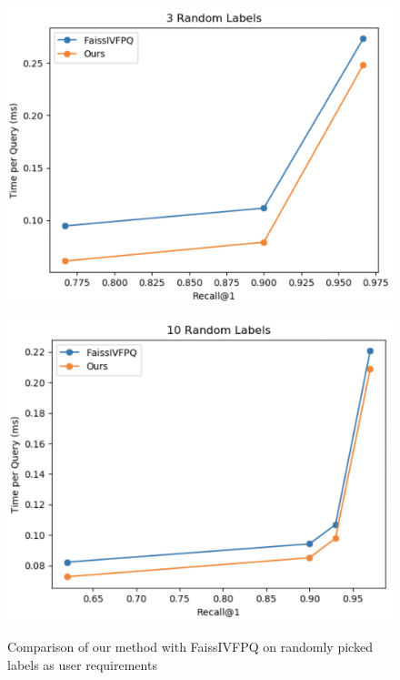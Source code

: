 \begin{figure}
    \centering
    \begin{minipage}[b]{.5\textwidth}
        \centering
        \includegraphics[width=.9\linewidth]{thesis/images/3_random.png}
        \label{fig:randomexpsub1}
    \end{minipage}%
    \begin{minipage}[b]{.5\textwidth}
        \centering
        \includegraphics[width=.9\linewidth]{thesis/images/10_random_only_mo1.png}
        \label{fig:randomexpsub2}
    \end{minipage}
    \caption{Comparison of our method with FaissIVFPQ on randomly picked labels as user requirements}
    \label{fig:randomexp}
\end{figure}


